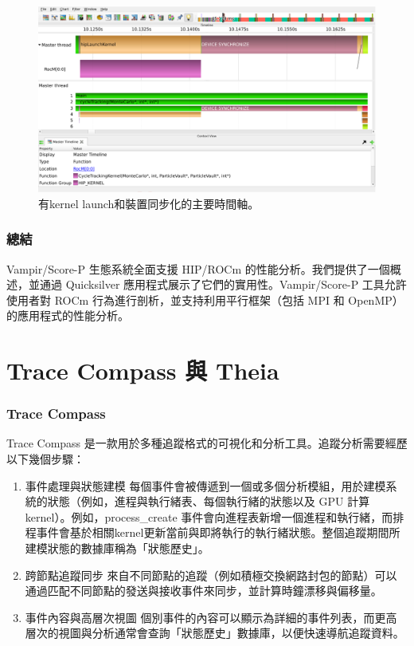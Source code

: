 \begin{figure}
    \centering
    \includegraphics[width=0.9\linewidth]{FileAusiliari/Screenshots/Figure13-12.png}
    \caption{有kernel launch和裝置同步化的主要時間軸。}
    \label{fig:PAPI12}
\end{figure}

\subsubsection{總結}
Vampir/Score-P 生態系統全面支援 HIP/ROCm 的性能分析。我們提供了一個概述，並通過 Quicksilver 應用程式展示了它們的實用性。Vampir/Score-P 工具允許使用者對 ROCm 行為進行剖析，並支持利用平行框架（包括 MPI 和 OpenMP）的應用程式的性能分析。


\section{Trace Compass 與 Theia}
\subsubsection{Trace Compass}

Trace Compass 是一款用於多種追蹤格式的可視化和分析工具。追蹤分析需要經歷以下幾個步驟：

\begin{enumerate}
    \item 事件處理與狀態建模
每個事件會被傳遞到一個或多個分析模組，用於建模系統的狀態（例如，進程與執行緒表、每個執行緒的狀態以及 GPU 計算kernel）。例如，process\_create 事件會向進程表新增一個進程和執行緒，而排程事件會基於相關kernel更新當前與即將執行的執行緒狀態。整個追蹤期間所建模狀態的數據庫稱為「狀態歷史」。
    \item 跨節點追蹤同步
來自不同節點的追蹤（例如積極交換網路封包的節點）可以通過匹配不同節點的發送與接收事件來同步，並計算時鐘漂移與偏移量。
    \item 事件內容與高層次視圖
個別事件的內容可以顯示為詳細的事件列表，而更高層次的視圖與分析通常會查詢「狀態歷史」數據庫，以便快速導航追蹤資料。
    
\end{enumerate}

